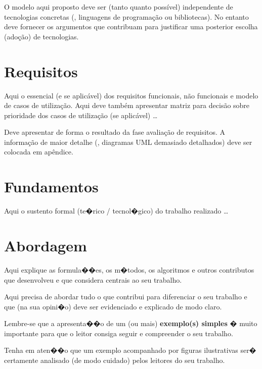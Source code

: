 O modelo aqui proposto deve ser (tanto quanto possível) independente de tecnologias concretas (\eg, linguagens de programação ou bibliotecas). No entanto deve fornecer os argumentos que contribuam para justificar uma posterior escolha (adoção) de tecnologias.


\section{Requisitos}
\label{sec:requisitos}

Aqui o essencial (e se aplicável) dos requisitos funcionais, não funcionais e modelo de casos de utilização. Aqui deve também apresentar matriz para decisão sobre prioridade dos casos de utilização (se aplicável) \ldots

Deve apresentar de forma  o resultado da fase avaliação de requisitos. A informação de maior detalhe (\eg, diagramas UML demasiado detalhados) deve ser colocada em apêndice.


\section{Fundamentos}
\label{sec:fundamentos}

Aqui o sustento formal (te�rico / tecnol�gico) do trabalho realizado \ldots


\section{Abordagem}
\label{sec:abordagem}

Aqui explique as formula��es, os m�todos, os algoritmos e outros contributos que desenvolveu e que considera centrais ao seu trabalho.

Aqui precisa de abordar tudo o que contribui para diferenciar o seu trabalho e que (na sua opini�o) deve ser evidenciado e explicado de modo claro.

Lembre-se que a apresenta��o de um (ou mais) \textbf{exemplo(s) simples} � muito importante para que o leitor consiga seguir e compreender o seu trabalho.

Tenha em aten��o que um exemplo acompanhado por figuras ilustrativas ser� certamente analisado (de modo cuidado) pelos leitores do seu trabalho.

